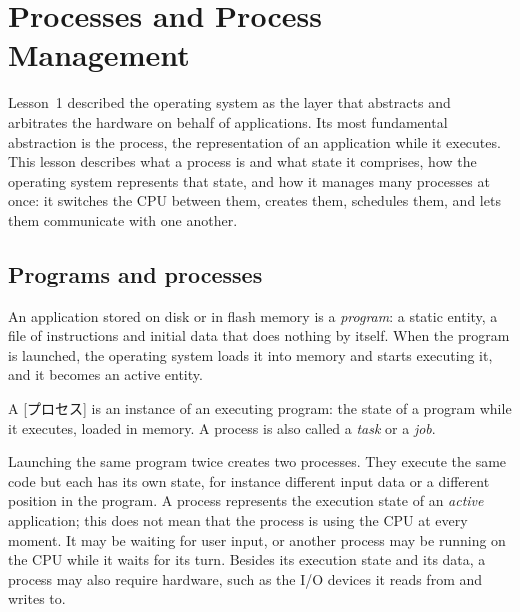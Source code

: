 \documentclass[../main.tex]{subfiles}
\begin{document}
\chapter{Processes and Process Management}

Lesson~1 described the operating system as the layer that abstracts and
arbitrates the hardware on behalf of applications.  Its most fundamental
abstraction is the process, the representation of an application while it
executes.  This lesson describes what a process is and what state it
comprises, how the operating system represents that state, and how it
manages many processes at once: it switches the CPU between them, creates
them, schedules them, and lets them communicate with one another.

\section{Programs and processes}
\label{sec:l02-process}

An application stored on disk or in flash memory is a
\emph{program}: a static entity, a file of instructions and initial data
that does nothing by itself.
When the program is launched, the operating system loads it into memory and
starts executing it, and it becomes an active entity.

\begin{definition}[Process]
  \label{def:l02-process}
  A [プロセス] is an instance of an executing program: the
  state of a program while it executes, loaded in memory.  A process is also
  called a \emph{task} or a \emph{job}.
\end{definition}

Launching the same program twice creates two processes.  They execute the
same code but each has its own state, for instance different input data or
a different position in the program.  A process represents the execution
state of an \emph{active} application; this does not mean that the process
is using the CPU at every moment.  It may be waiting for user input, or
another process may be running on the CPU while it waits for its turn.
Besides its execution state and its data, a process may also require
hardware, such as the I/O devices it reads from and writes to.
\end{document}
